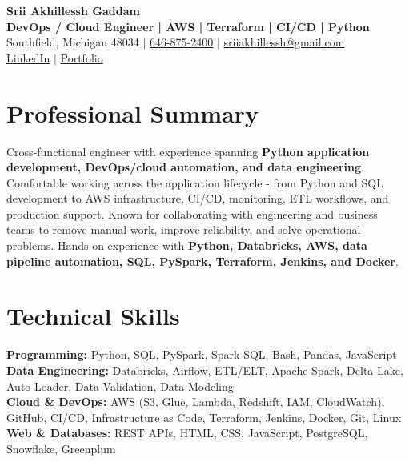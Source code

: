 \documentclass[letterpaper,10pt]{article}
\begin{document}
\fontsize{9.35pt}{10.45pt}\selectfont

\begin{center}
    {\LARGE \textbf{Srii Akhillessh Gaddam}} \\[-1pt]
    \textbf{DevOps / Cloud Engineer | AWS | Terraform | CI/CD | Python} \\[2pt]
    Southfield, Michigan 48034 $|$
    \href{tel:6468752400}{646-875-2400} $|$
    \href{mailto:sriiakhillessh@gmail.com}{sriiakhillessh@gmail.com} \\[1pt]
    \href{https://www.linkedin.com/in/srii-akhiilessh-gaddam-b48668191/}{LinkedIn} $|$
    \href{https://sriiakhillesshg.github.io/portfolio/}{Portfolio}
\end{center}
\vspace{-8pt}

\section{Professional Summary}
\small{Cross-functional engineer with experience spanning \textbf{Python application development, DevOps/cloud automation, and data engineering}. Comfortable working across the application lifecycle - from Python and SQL development to AWS infrastructure, CI/CD, monitoring, ETL workflows, and production support. Known for collaborating with engineering and business teams to remove manual work, improve reliability, and solve operational problems. Hands-on experience with \textbf{Python, Databricks, AWS, data pipeline automation, SQL, PySpark, Terraform, Jenkins, and Docker}.}

\section{Technical Skills}
\small{
\textbf{Programming:} Python, SQL, PySpark, Spark SQL, Bash, Pandas, JavaScript \\
\textbf{Data Engineering:} Databricks, Airflow, ETL/ELT, Apache Spark, Delta Lake, Auto Loader, Data Validation, Data Modeling \\
\textbf{Cloud \& DevOps:} AWS (S3, Glue, Lambda, Redshift, IAM, CloudWatch), GitHub, CI/CD, Infrastructure as Code, Terraform, Jenkins, Docker, Git, Linux \\
\textbf{Web \& Databases:} REST APIs, HTML, CSS, JavaScript, PostgreSQL, Snowflake, Greenplum
}
\end{document}
